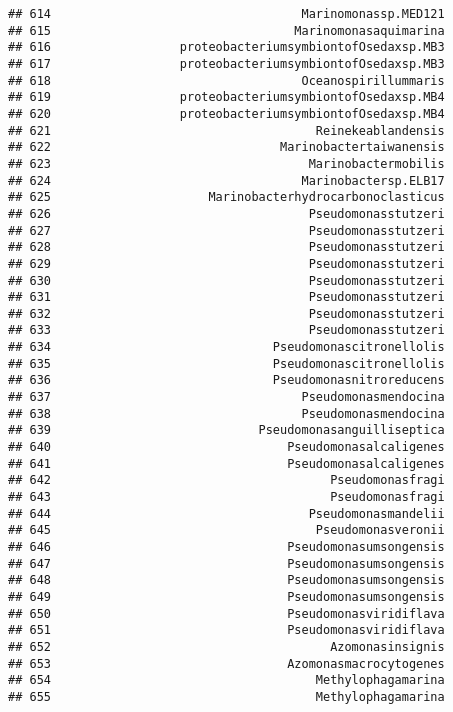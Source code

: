 \documentclass[
]{article}
\begin{document}
\begin{verbatim}
## 614                                   Marinomonassp.MED121
## 615                                  Marinomonasaquimarina
## 616                  proteobacteriumsymbiontofOsedaxsp.MB3
## 617                  proteobacteriumsymbiontofOsedaxsp.MB3
## 618                                   Oceanospirillummaris
## 619                  proteobacteriumsymbiontofOsedaxsp.MB4
## 620                  proteobacteriumsymbiontofOsedaxsp.MB4
## 621                                     Reinekeablandensis
## 622                                Marinobactertaiwanensis
## 623                                    Marinobactermobilis
## 624                                   Marinobactersp.ELB17
## 625                      Marinobacterhydrocarbonoclasticus
## 626                                    Pseudomonasstutzeri
## 627                                    Pseudomonasstutzeri
## 628                                    Pseudomonasstutzeri
## 629                                    Pseudomonasstutzeri
## 630                                    Pseudomonasstutzeri
## 631                                    Pseudomonasstutzeri
## 632                                    Pseudomonasstutzeri
## 633                                    Pseudomonasstutzeri
## 634                               Pseudomonascitronellolis
## 635                               Pseudomonascitronellolis
## 636                               Pseudomonasnitroreducens
## 637                                   Pseudomonasmendocina
## 638                                   Pseudomonasmendocina
## 639                             Pseudomonasanguilliseptica
## 640                                 Pseudomonasalcaligenes
## 641                                 Pseudomonasalcaligenes
## 642                                       Pseudomonasfragi
## 643                                       Pseudomonasfragi
## 644                                    Pseudomonasmandelii
## 645                                     Pseudomonasveronii
## 646                                 Pseudomonasumsongensis
## 647                                 Pseudomonasumsongensis
## 648                                 Pseudomonasumsongensis
## 649                                 Pseudomonasumsongensis
## 650                                 Pseudomonasviridiflava
## 651                                 Pseudomonasviridiflava
## 652                                       Azomonasinsignis
## 653                                 Azomonasmacrocytogenes
## 654                                     Methylophagamarina
## 655                                     Methylophagamarina

\end{verbatim}
\end{document}

